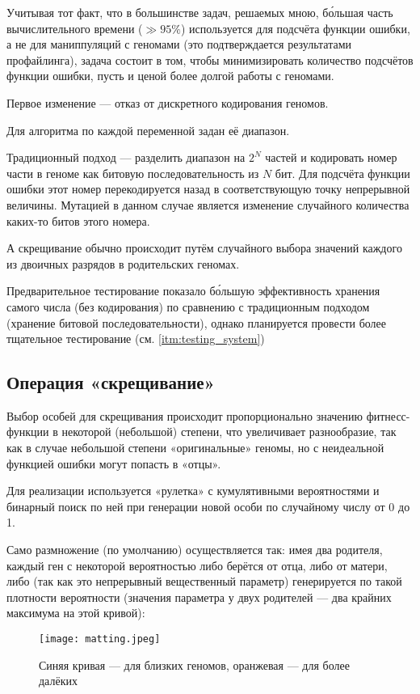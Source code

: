 Учитывая тот факт, что в большинстве задач, решаемых мною, бо́льшая часть вычислительного времени ($\gg 95\%$) используется для подсчёта функции ошибки, а не для маниппуляций с геномами
(это подтверждается результатами профайлинга),
задача состоит в том, чтобы минимизировать количество подсчётов функции ошибки, пусть и ценой более долгой работы с геномами.

Первое изменение — отказ от дискретного кодирования геномов.

Для алгоритма по каждой переменной задан её диапазон.

Традиционный подход — разделить диапазон на $2^N$ частей и кодировать номер части в геноме как битовую последовательность из $N$ бит.
Для подсчёта функции ошибки этот номер перекодируется назад в соответствующую точку непрерывной величины.
Мутацией в данном случае является изменение случайного количества каких-то битов этого номера.

А скрещивание обычно происходит путём случайного выбора значений каждого из двоичных разрядов в родительских геномах.

Предварительное тестирование показало бо́льшую эффективность хранения самого числа (без кодирования) по сравнению с традиционным подходом (хранение битовой последовательности), однако планируется провести более тщательное тестирование (см. \ref{itm:testing_system})

\subsection{Операция «скрещивание»}\label{subsec:matting}

Выбор особей для скрещивания происходит пропорционально значению фитнесс-функции в некоторой (небольшой) степени,
что увеличивает разнообразие, так как в случае небольшой степени «оригинальные» геномы, но с неидеальной функцией ошибки могут попасть в «отцы».

Для реализации используется «рулетка» с кумулятивными вероятностями и бинарный поиск по ней при генерации новой особи по случайному числу от 0 до 1.

Само размножение (по умолчанию) осуществляется так: имея два родителя, каждый ген с некоторой вероятностью
либо берётся от отца, либо от матери, либо (так как это непрерывный вещественный параметр)
генерируется по такой плотности вероятности (значения параметра у двух родителей — два крайних максимума на этой кривой):

\begin{figure}[h!]
    \centering
    \texttt{[image: matting.jpeg]}
    \caption{Синяя кривая — для близких геномов, оранжевая — для более далёких}
    \label{fig:}
\end{figure}
\FloatBarrier

